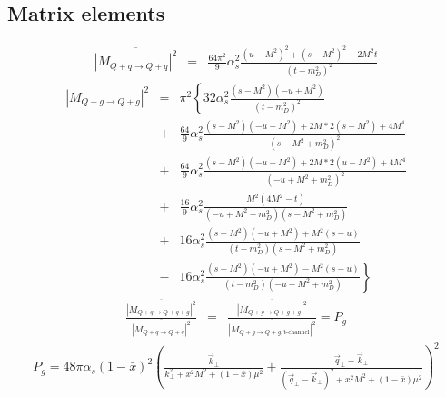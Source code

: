 \documentclass[aps, prc, reprint, amsmath, groupedaddress, nofootinbib]{revtex4-1}
\begin{document}
\begin{appendices}
\section{Matrix elements}
\label{appendix:matrix-element}
\begin{widetext}
\begin{eqnarray}
\overline{|M_{Q+q\rightarrow Q+q}|^2} &=& \frac{64\pi^2}{9}\alpha_s^2 \frac{(u-M^2)^2 + (s-M^2)^2 + 2 M^2 t}{(t-m_D^2)^2}
\end{eqnarray}
\begin{eqnarray}
\overline{|M_{Q+g\rightarrow Q+g}|^2} &=& \pi^2 \left\{
32\alpha_s^2 \frac{(s-M^2)(-u+M^2)}{(t-m_D^2)^2} \right. \\ \nonumber
&+&\frac{64}{9}\alpha_s^2 \frac{(s-M^2)(-u+M^2)+2M*2(s-M^2) + 4M^4}{(s-M^2+m_D^2)^2} \\ \nonumber
&+&\frac{64}{9}\alpha_s^2 \frac{(s-M^2)(-u+M^2)+2M*2(u-M^2) + 4M^4}{(-u+M^2+m_D^2)^2} \\ \nonumber
&+&\frac{16}{9}\alpha_s^2 \frac{M^2(4M^2 - t)}{(-u+M^2+m_D^2)(s-M^2+m_D^2)} \\ \nonumber
&+& 16 \alpha_s^2 \frac{(s-M^2)(-u+M^2)+M^2(s-u)}{(t-m_D^2)(s-M^2+m_D^2)} \\ \nonumber
&-& \left. 16 \alpha_s^2 \frac{(s-M^2)(-u+M^2)-M^2(s-u)}{(t-m_D^2)(-u+M^2+m_D^2)}\right\} 
\end{eqnarray}
\begin{eqnarray}
\frac{\overline{|M_{Q+q\rightarrow Q+q+g}|^2}}{\overline{|M_{Q+q\rightarrow Q+q}|^2}} &=&  \frac{\overline{|M_{Q+g\rightarrow Q+g+g}|^2}}{\overline{|M_{Q+g\rightarrow Q+g, \textrm{t-channel}}|^2}} = P_g
\end{eqnarray}
\begin{eqnarray}
P_g = 48 \pi \alpha_s (1-\bar{x})^2 \left(\frac{\vec{k}_\perp}{k_\perp^2 + x^2 M^2 + (1-\bar{x})\mu^2} 
+ \frac{\vec{q}_\perp - \vec{k}_\perp}{(\vec{q}_\perp-\vec{k}_\perp)^2 + x^2 M^2 + (1-\bar{x})\mu^2}
\right)^2 
\end{eqnarray}
\end{widetext}


\end{appendices}
\end{document}
